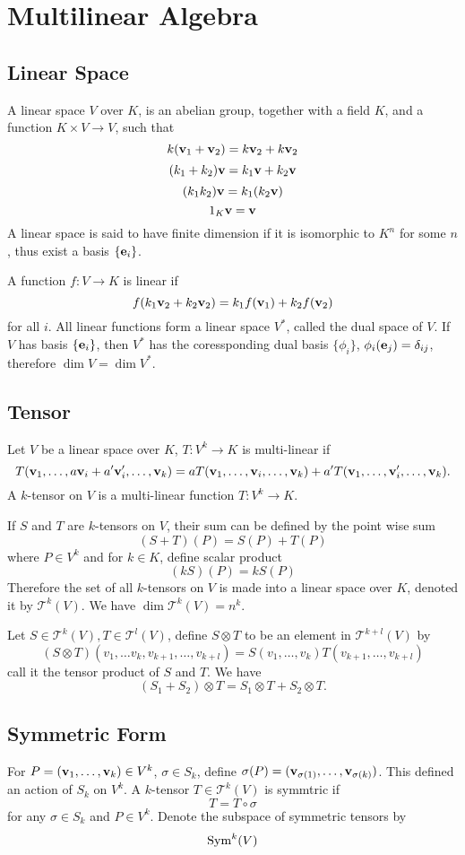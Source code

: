 \section{Multilinear Algebra}
\subsection{Linear Space}
A linear space $V$ over $K$, is an abelian group, together with a field $K$,
and a function $K \times V \to V$, such that
$$k({\bf v}_1 + {\bf v}_2) = k{\bf v}_2 + k{\bf v}_2$$
$$(k_1 + k_2){\bf v} = k_1{\bf v} + k_2{\bf v}$$
$$(k_1k_2){\bf v} = k_1(k_2 {\bf v})$$
$$1_K {\bf v} = {\bf v}$$
A linear space is said to have finite dimension if it is isomorphic to $K^n$
for some $n$, thus exist a basis $\{{\bf e}_i\}$.

A function $f : V \to K$ is linear if
$$f(k_1 {\bf v}_2 + k_2 {\bf v}_2) = k_1 f({\bf v}_1) + k_2 f({\bf v}_2)$$
for all $i$.
All linear functions form a linear space $V^\ast$, called the dual space of $V$.
If $V$ has basis $\{{\bf e}_i\}$,
then $V^\ast$ has the coressponding dual basis $\{\phi_i\}$,
$\phi_i({\bf e}_j) = \delta_{ij}$,
therefore $\dim V = \dim V^\ast$.

\subsection{Tensor}
Let $V$ be a linear space over $K$, $T : V^k \to K$ is multi-linear if
$$T({\bf v}_1, \dots , a {\bf v}_i + a^\prime {\bf v}_i^\prime, \dots, {\bf v}_k)
= a T({\bf v}_1, \dots, {\bf v}_i, \dots, {\bf v}_k)
+ a^\prime T({\bf v}_1, \dots, {\bf v}_i^\prime, \dots, {\bf v}_k).$$
A $k$-tensor on $V$ is a multi-linear function $T : V^k \to K$.

If $S$ and $T$ are $k$-tensors on $V$, their sum can be defined by the point wise sum
$$(S + T)(P) = S(P) + T(P)$$
where $P \in V^k$ and for $k \in K$, define scalar product
$$(k S)(P) = k S(P)$$
Therefore the set of all $k$-tensors on $V$ is made into a linear space
over $K$, denoted it by $\mathcal{T}^k(V)$.
We have $\dim \mathcal{T}^k(V) = n^k$.


Let $S \in \mathcal{T}^k(V), T \in \mathcal{T}^l(V)$,
define $S \otimes T$ to be an element in $\mathcal{T}^{k + l}(V)$ by
$$(S \otimes T)(v_1, \dots v_k, v_{k+1}, \dots, v_{k + l})
= S(v_1, \dots, v_k)T(v_{k+1}, \dots, v_{k+l})$$
call it the tensor product of $S$ and $T$.
We have $$(S_1 + S_2) \otimes T = S_1 \otimes T + S_2 \otimes T.$$

\subsection{Symmetric Form}
For $P = ({\bf v}_1, \dots, {\bf v}_k) \in V^k$, $\sigma \in S_k$,
define $\sigma(P) = ({\bf v}_{\sigma(1)}, \dots, {\bf v}_{\sigma(k)})$.
This defined an action of $S_k$ on $V^k$.
A $k$-tensor $T \in \mathcal T^k(V)$ is symmtric if
$$T = T \circ \sigma$$
for any $\sigma \in S_k$ and $P \in V^k$.
Denote the subspace of symmetric tensors by $${\mathop{\mathrm{Sym}}}^k(V)$$


